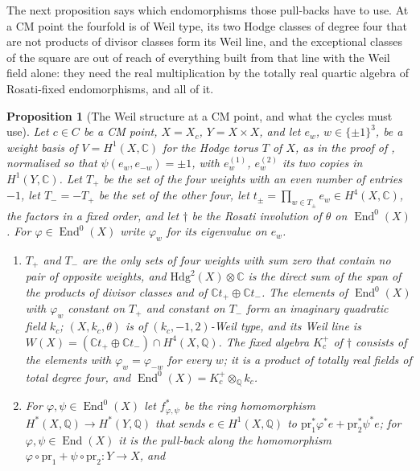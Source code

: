 \documentclass[11pt,reqno]{amsart}
\theoremstyle{plain}
\newtheorem{proposition}[theorem]{Proposition}
\theoremstyle{definition}
\theoremstyle{remark}
\newcommand{\QQ}{\mathbb{Q}}
\newcommand{\CC}{\mathbb{C}}
\newcommand{\Hdg}{\mathrm{Hdg}}
\newcommand{\HW}{W}                      %
\DeclareMathOperator{\End}{End}
\begin{document}
The next proposition says which endomorphisms those pull-backs have to use.
At a CM point the fourfold is of Weil type, its two Hodge classes of degree
four that are not products of divisor classes form its Weil line, and the
exceptional classes of the square are out of reach of everything built from
that line with the Weil field alone: they need the real multiplication by the
totally real quartic algebra of Rosati-fixed endomorphisms, and all of it.

\begin{proposition}[The Weil structure at a CM point, and what the cycles
must use]\label{prop:cmsource}
Let $c\in C$ be a CM point, $X=X_{c}$, $Y=X\times X$, and let $e_{w}$,
$w\in\{\pm1\}^{3}$, be a weight basis of $V=H^{1}(X,\CC)$ for the Hodge torus
$T$ of $X$, as in the proof of , normalised so that
$\psi(e_{w},e_{-w})=\pm1$, with $e^{(1)}_{w}$, $e^{(2)}_{w}$ its two copies in
$H^{1}(Y,\CC)$. Let $T_{+}$ be the set of the four weights with an even
number of entries $-1$, let $T_{-}=-T_{+}$ be the set of the other four, let
$t_{\pm}=\prod_{w\in T_{\pm}}e_{w}\in H^{4}(X,\CC)$, the factors in a fixed
order, and let $\dagger$ be the Rosati involution of $\theta$ on
$\End^{0}(X)$. For $\varphi\in\End^{0}(X)$ write $\varphi_{w}$ for its
eigenvalue on $e_{w}$.
\begin{enumerate}[label=\textup{(\roman*)},leftmargin=2.6em,itemsep=2pt]
\item $T_{+}$ and $T_{-}$ are the only sets of four weights with sum zero
  that contain no pair of opposite weights, and $\Hdg^{2}(X)\otimes\CC$ is
  the direct sum of the span of the products of divisor classes and of
  $\CC t_{+}\oplus\CC t_{-}$. The elements of $\End^{0}(X)$ with
  $\varphi_{w}$ constant on $T_{+}$ and constant on $T_{-}$ form an imaginary
  quadratic field $k_{c}$; $(X,k_{c},\theta)$ is of $(k_{c},-1,2)$-Weil type,
  and its Weil line is $\HW(X)=(\CC t_{+}\oplus\CC t_{-})\cap H^{4}(X,\QQ)$.
  The fixed algebra $K_{c}^{+}$ of $\dagger$ consists of the elements with
  $\varphi_{w}=\varphi_{-w}$ for every $w$; it is a product of totally real
  fields of total degree four, and $\End^{0}(X)=K_{c}^{+}\otimes_{\QQ}k_{c}$.
\item For $\varphi,\psi\in\End^{0}(X)$ let $f_{\varphi,\psi}^{*}$ be the ring
  homomorphism $H^{*}(X,\QQ)\to H^{*}(Y,\QQ)$ that sends $e\in H^{1}(X,\QQ)$
  to $\mathrm{pr}_{1}^{*}\varphi^{*}e+\mathrm{pr}_{2}^{*}\psi^{*}e$; for
  $\varphi,\psi\in\End(X)$ it is the pull-back along the homomorphism
  $\varphi\circ\mathrm{pr}_{1}+\psi\circ\mathrm{pr}_{2}\colon Y\to X$, and

\end{enumerate}
\end{proposition}
\end{document}
